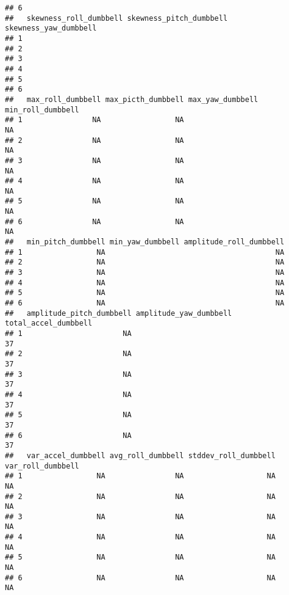 \documentclass[]{article}
\begin{document}
\begin{verbatim}
## 6                                                                     
##   skewness_roll_dumbbell skewness_pitch_dumbbell skewness_yaw_dumbbell
## 1                                                                     
## 2                                                                     
## 3                                                                     
## 4                                                                     
## 5                                                                     
## 6                                                                     
##   max_roll_dumbbell max_picth_dumbbell max_yaw_dumbbell min_roll_dumbbell
## 1                NA                 NA                                 NA
## 2                NA                 NA                                 NA
## 3                NA                 NA                                 NA
## 4                NA                 NA                                 NA
## 5                NA                 NA                                 NA
## 6                NA                 NA                                 NA
##   min_pitch_dumbbell min_yaw_dumbbell amplitude_roll_dumbbell
## 1                 NA                                       NA
## 2                 NA                                       NA
## 3                 NA                                       NA
## 4                 NA                                       NA
## 5                 NA                                       NA
## 6                 NA                                       NA
##   amplitude_pitch_dumbbell amplitude_yaw_dumbbell total_accel_dumbbell
## 1                       NA                                          37
## 2                       NA                                          37
## 3                       NA                                          37
## 4                       NA                                          37
## 5                       NA                                          37
## 6                       NA                                          37
##   var_accel_dumbbell avg_roll_dumbbell stddev_roll_dumbbell var_roll_dumbbell
## 1                 NA                NA                   NA                NA
## 2                 NA                NA                   NA                NA
## 3                 NA                NA                   NA                NA
## 4                 NA                NA                   NA                NA
## 5                 NA                NA                   NA                NA
## 6                 NA                NA                   NA                NA

\end{verbatim}
\end{document}
